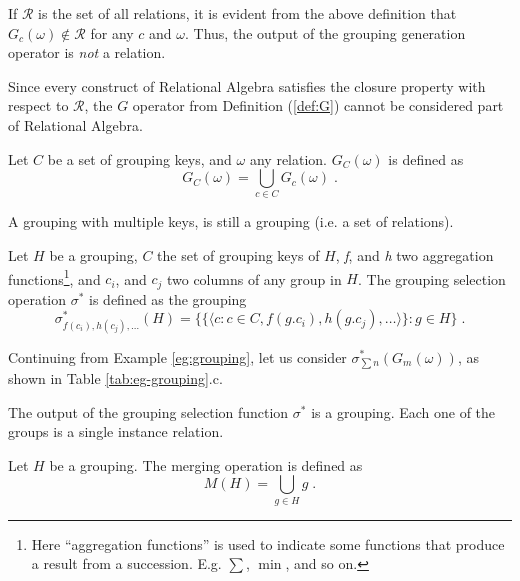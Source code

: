 \begin{observation}\label{obs:G-not-in-R}
If $\mathcal{R}$ is the set of all relations, it is evident from the above definition that $G_c(\omega) \not\in \mathcal{R}$ for any $c$ and $\omega$.
Thus, the output of the grouping generation operator is \emph{not} a relation.

Since every construct of Relational Algebra satisfies the closure property with respect to $\mathcal{R}$, the $G$ operator from Definition (\ref{def:G}) cannot be considered part of Relational Algebra.
\end{observation}

\begin{definition}
Let $C$ be a set of grouping keys, and $\omega$ any relation.
$G_C(\omega)$ is defined as
$$
G_C(\omega) = \bigcup_{c \in C}G_c(\omega) \; .
$$
\end{definition}

\begin{observation}
A grouping with multiple keys, is still a grouping (i.e. a set of relations).
\end{observation}

\begin{definition}
Let $H$ be a grouping, $C$ the set of grouping keys of $H$, \emph{f}, and \emph{h} two aggregation functions\footnote{%
Here ``aggregation functions'' is used to indicate some functions that produce a result from a succession. E.g. $\sum$, $\min$, and so on.
}, and $c_i$, and $c_j$ two columns of any group in $H$.
The grouping selection operation $\sigma^*$ is defined as the grouping
$$
\sigma^*_{f(c_i), h(c_j), \dots}(H) = \Big\{
    \big\{ \langle c : c \in C, f(g.c_i), h(g.c_j), \dots \rangle \big\} : g \in H
\Big\} \; .
$$
\end{definition}

\begin{example}\label{eg:grouping-selection}
Continuing from Example \ref{eg:grouping}, let us consider $\sigma^*_{\sum{n}}(G_m(\omega))$, as shown in Table \ref{tab:eg-grouping}.c.
\end{example}

\begin{observation}
The output of the grouping selection function $\sigma^*$ is a grouping.
Each one of the groups is a single instance relation.
\end{observation}

\begin{definition}
Let $H$ be a grouping. The merging operation is defined as
$$
M(H) = \bigcup_{g \in H} g \; .
$$
\end{definition}

